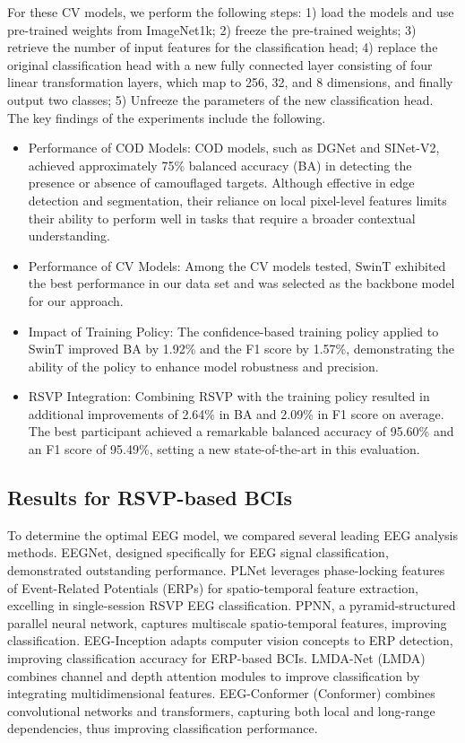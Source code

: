 \documentclass[preprint,12pt,authoryear]{elsarticle}
\begin{document}
For these CV models, we perform the following steps: 1) load the models and use pre-trained weights from ImageNet1k; 2) freeze the pre-trained weights; 3) retrieve the number of input features for the classification head; 4) replace the original classification head with a new fully connected layer consisting of four linear transformation layers, which map to 256, 32, and 8 dimensions, and finally output two classes; 5) Unfreeze the parameters of the new classification head. The key findings of the experiments include the following.

\begin{itemize}
\item Performance of COD Models: COD models, such as DGNet and SINet-V2, achieved approximately 75\% balanced accuracy (BA) in detecting the presence or absence of camouflaged targets. Although effective in edge detection and segmentation, their reliance on local pixel-level features limits their ability to perform well in tasks that require a broader contextual understanding.

\item Performance of CV Models: Among the CV models tested, SwinT exhibited the best performance in our data set and was selected as the backbone model for our approach.

\item Impact of Training Policy: The confidence-based training policy applied to SwinT improved BA by 1.92\% and the F1 score by 1.57\%, demonstrating the ability of the policy to enhance model robustness and precision.

\item RSVP Integration: Combining RSVP with the training policy resulted in additional improvements of 2.64\% in BA and 2.09\% in F1 score on average. The best participant achieved a remarkable balanced accuracy of 95.60\% and an F1 score of 95.49\%, setting a new state-of-the-art in this evaluation.
\end{itemize}
\subsection{Results for RSVP-based BCIs}
To determine the optimal EEG model, we compared several leading EEG analysis methods. EEGNet, designed specifically for EEG signal classification, demonstrated outstanding performance. PLNet leverages phase-locking features of Event-Related Potentials (ERPs) for spatio-temporal feature extraction, excelling in single-session RSVP EEG classification. PPNN, a pyramid-structured parallel neural network, captures multiscale spatio-temporal features, improving classification. EEG-Inception adapts computer vision concepts to ERP detection, improving classification accuracy for ERP-based BCIs. LMDA-Net (LMDA) combines channel and depth attention modules to improve classification by integrating multidimensional features. EEG-Conformer (Conformer) combines convolutional networks and transformers, capturing both local and long-range dependencies, thus improving classification performance.
\end{document}
